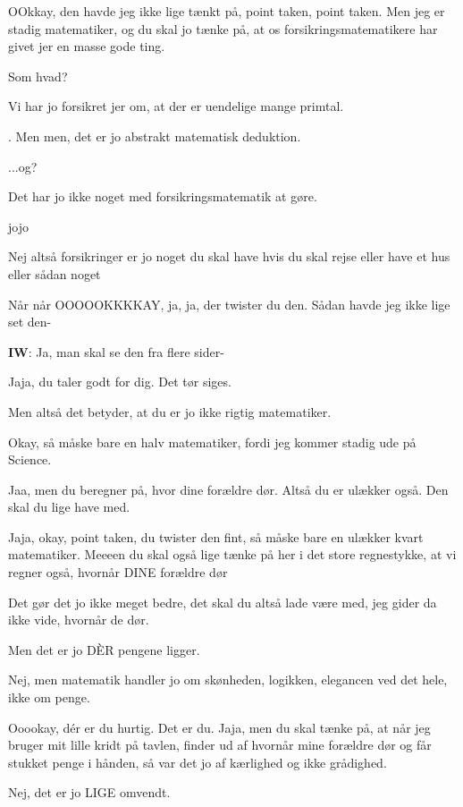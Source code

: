 \documentclass{article}
\begin{document}
\begin{sketch}
 OOkkay, den havde jeg ikke lige tænkt på, point taken, point taken. Men jeg er stadig matematiker, og du skal jo tænke på, at os forsikringsmatematikere har givet jer en masse gode ting.

 Som hvad?

 Vi har jo forsikret jer om, at der er uendelige mange primtal.

. Men men, det er jo abstrakt matematisk deduktion.

 ...og?

 Det har jo ikke noget med forsikringsmatematik at gøre.

 jojo

 Nej altså forsikringer er jo noget du skal have hvis du skal rejse eller have et hus eller sådan noget

 Når når OOOOOKKKKAY, ja, ja, der twister du den. Sådan havde jeg ikke lige set den-

\textbf{IW}: Ja, man skal se den fra flere sider-

 Jaja, du taler godt for dig. Det tør siges.

 Men altså det betyder, at du er jo ikke rigtig matematiker.

 Okay, så måske bare en halv matematiker, fordi jeg kommer stadig ude på Science.

 Jaa, men du beregner på, hvor dine forældre dør. Altså du er ulækker også. Den skal du lige have med.

 Jaja, okay, point taken, du twister den fint, så måske bare en ulækker kvart matematiker. Meeeen du skal også lige tænke på her i det store regnestykke, at vi regner også, hvornår DINE forældre dør

 Det gør det jo ikke meget bedre, det skal du altså lade være med, jeg gider da ikke vide, hvornår de dør. 

 Men det er jo DÈR pengene ligger.

 Nej, men matematik handler jo om skønheden, logikken, elegancen ved det hele, ikke om penge.

 Ooookay, dér er du hurtig. Det er du. Jaja, men du skal tænke på, at når jeg bruger mit lille kridt på tavlen, finder ud af hvornår mine forældre dør og får stukket penge i hånden, så var det jo af kærlighed og ikke grådighed.

\noindent{} Nej, det er jo LIGE omvendt.


\end{sketch}
\end{document}
